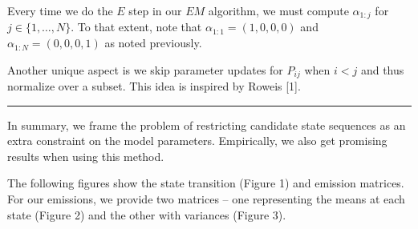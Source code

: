 \documentclass[english]{article}
\numberwithin{equation}{section}
\DeclarePairedDelimiter\paren{(}{)}           %
\DeclarePairedDelimiter\bkt{[}{]}             %
\begin{document}
	Every time we do the $E$ step in our $EM$ algorithm, we must compute $\alpha_{1:j}$ for $j\in \{1,\ldots,N\}$. To that extent, note that $\alpha_{1:1}=(1,0,0,0)$ and $\alpha_{1:N}=(0,0,0,1)$ as noted previously.
	
	Another unique aspect is we skip parameter updates for $P_{ij}$ when $i<j$ and thus normalize over a subset. This idea is inspired by Roweis [1].
	
	
	\par\noindent\rule{\textwidth}{0.4pt}
	
	In summary, we frame the problem of restricting candidate state sequences as an extra constraint on the model parameters. Empirically, we also get promising results when using this method. 

	The following figures show the state transition (Figure 1) and emission matrices. For our emissions, we provide two matrices -- one representing the means at each state (Figure 2) and the other with variances (Figure 3).
%	
%	
%	
%	
%	
%	
%	
%	
	
\end{document}
